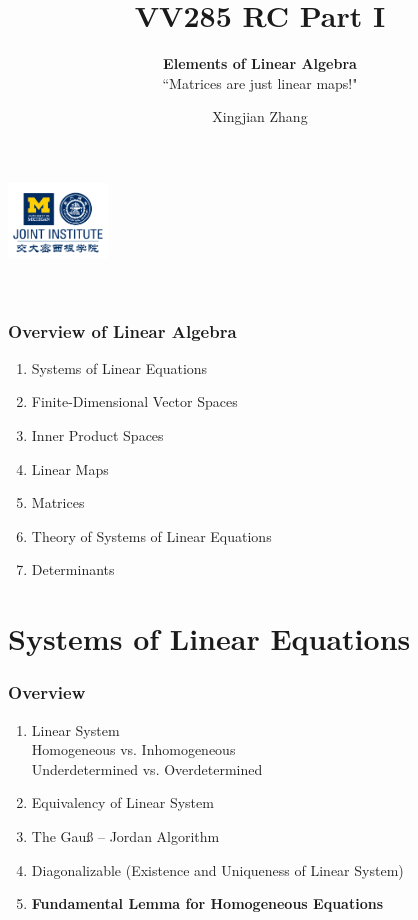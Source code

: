 \documentclass[12pt, t]{beamer}
\title{VV285 RC Part I}
\subtitle{\textbf{Elements of Linear Algebra}\\``Matrices are just linear maps!"}
\institute[UM-SJTU JI]{Univerity of Michigan-Shanghai Jiao Tong University Joint Institute}
\author{Xingjian Zhang}
\begin{document}
\begin{frame}
    \titlepage
    \begin{center}
        \includegraphics[height=2cm]{logo2.png}
    \end{center}
\end{frame}

\begin{frame}
    \
    \frametitle{Overview of Linear Algebra}
    \begin{enumerate}
        \item Systems of Linear Equations
        \item Finite-Dimensional Vector Spaces
        \item Inner Product Spaces
        \item Linear Maps
        \item Matrices
        \item Theory of Systems of Linear Equations
        \item Determinants
    \end{enumerate}
\end{frame}

\section{Systems of Linear Equations}
\begin{frame}
    \frametitle{Overview}
    \begin{enumerate}
        \item Linear System
              \\ Homogeneous vs. Inhomogeneous
              \\ Underdetermined vs. Overdetermined
        \item Equivalency of Linear System
        \item The Gauß – Jordan Algorithm
        \item Diagonalizable (Existence and Uniqueness of Linear System)
        \item \textbf{Fundamental Lemma for Homogeneous Equations}
    \end{enumerate}
\end{frame}
\end{document}
